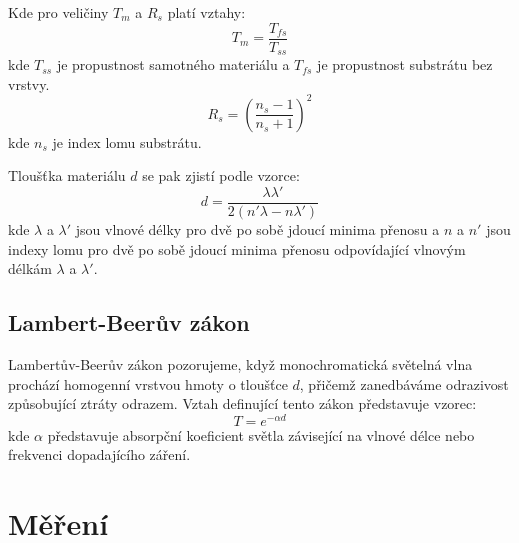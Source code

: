 \documentclass[a4paper,11pt]{article}
\begin{document}
\newpage
    \begin{minipage}[t]{0.5\textwidth} 
                Kde pro veličiny $T_m$ a $R_s$ platí vztahy:
                \begin{equation}
                    T_m = \frac{T_{fs}}{T_{ss}}
                \end{equation}
                kde $T_{ss}$ je propustnost samotného materiálu a $T_{fs}$ je propustnost substrátu bez vrstvy.
                \begin{equation}
                    R_s = \left(\frac{n_s-1}{n_s+1}\right)^2
                \end{equation}
                kde $n_s$ je index lomu substrátu.
                \par Tloušťka materiálu $d$ se pak zjistí podle vzorce: 
                \begin{equation}
                    d = \frac{\lambda\lambda'}{2(n'\lambda - n\lambda')}
                \end{equation}
                kde $\lambda$ a $\lambda'$ jsou vlnové délky pro dvě po sobě jdoucí minima přenosu a $n$ a $n'$ jsou indexy lomu pro dvě po sobě jdoucí minima přenosu odpovídající vlnovým délkám $\lambda$ a $\lambda'$.
            \subsection{Lambert-Beerův zákon}
                Lambertův-Beerův zákon pozorujeme, když monochromatická světelná vlna prochází homogenní vrstvou hmoty o tloušťce $d$, přičemž zanedbáváme odrazivost způsobující ztráty odrazem. Vztah definující tento zákon představuje vzorec:
                \begin{equation}
                    T = e^{-\alpha d}
                \end{equation}
                kde $\alpha$ představuje absorpční koeficient světla závisející na vlnové délce nebo frekvenci dopadajícího záření.
        \section{Měření} 

\end{minipage}
\end{document}
